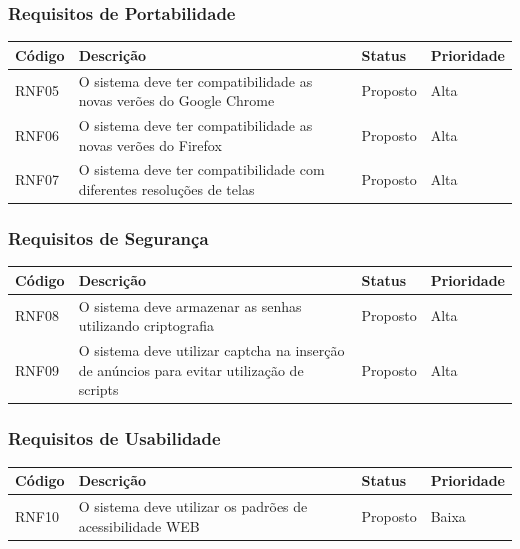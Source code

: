 \documentclass[a4paper, 12pt]{article}
\begin{document}
\subsubsection{Requisitos de Portabilidade}
\begin{table}[ht]
	\centering

	\begin{tabular}{p{2cm}p{7cm}p{2cm}p{2cm}}
		\hline
		\cellcolor{gray}Código&\cellcolor{gray}Descrição&\cellcolor{gray}Status&\cellcolor{gray}Prioridade  \\
		\hline
		RNF05&O sistema deve ter compatibilidade as novas ver\~{o}es do Google Chrome&Proposto&Alta\\
        RNF06&O sistema deve ter compatibilidade as novas ver\~{o}es do Firefox&Proposto&Alta\\
        RNF07&O sistema deve ter compatibilidade com diferentes resolu\c{c}\~{o}es de telas&Proposto&Alta\\
		\hline
	\end{tabular}
\end{table}%
\newpage
\subsubsection{Requisitos de Segurança}
\begin{table}[ht]
	\rowcolors{1}{}{}
	\centering

	\begin{tabular}{p{2cm}p{7cm}p{2cm}p{2cm}}
		\hline
		\cellcolor{gray}Código&\cellcolor{gray}Descrição&\cellcolor{gray}Status&\cellcolor{gray}Prioridade  \\
		\hline
		RNF08&O sistema deve armazenar as senhas utilizando criptografia&Proposto&Alta\\
        RNF09&O sistema deve utilizar captcha na inser\c{c}\~{a}o de an\'{u}ncios para evitar utiliza\c{c}\~{a}o de scripts&Proposto&Alta\\
		\hline
	\end{tabular}
\end{table}%
\subsubsection{Requisitos de Usabilidade}
\begin{table}[ht]
	\centering

	\begin{tabular}{p{2cm}p{7cm}p{2cm}p{2cm}}
		\hline
		\cellcolor{gray}Código&\cellcolor{gray}Descrição&\cellcolor{gray}Status&\cellcolor{gray}Prioridade  \\
		\hline
		RNF10&O sistema deve utilizar os padr\~{o}es de acessibilidade WEB&Proposto&Baixa\\
		\hline
	\end{tabular}
\end{table}%
\end{document}
